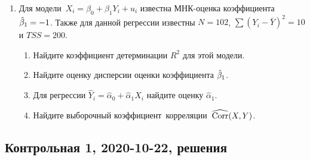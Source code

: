 \begin{enumerate}
\item Для модели $X_i = \beta_0 + \beta_1 Y_i + u_i$ известна МНК-оценка коэффициента $\hat{\beta}_1 = -1$. 
Также для данной регрессии известны $N=102$, $\sum (Y_i - \bar Y)^2=10$ и  $TSS=200$. 
\begin{enumerate}
    \item  Найдите коэффициент детерминации $R^2$ для этой модели.
\item Найдите оценку дисперсии оценки коэффициента $\hat{\beta}_1$.
\item Для регрессии $\hat Y_i = \hat\alpha_0 + \hat\alpha_1 X_i$ найдите оценку $\hat\alpha_1$.
\item Найдите выборочный коэффициент корреляции $\operatorname{\widehat{\operatorname{Corr}}}(X,Y)$.
\end{enumerate}



\end{enumerate}


\subsection{Контрольная 1, 2020-10-22, решения}

